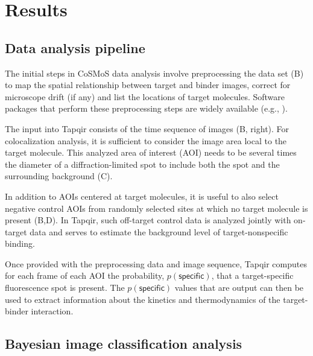 \section{Results}

\subsection{Data analysis pipeline}

The initial steps in CoSMoS data analysis involve preprocessing the data set (B) to map the spatial relationship between target and binder images, correct for microscope drift (if any) and list the locations of target molecules. Software packages that perform these preprocessing steps are widely available (e.g., \cite{Friedman2015-nx, Smith2019-yb}).

The input into Tapqir consists of the time sequence of images (B, right). For colocalization analysis, it is sufficient to consider the image area local to the target molecule. This analyzed area of interest (AOI) needs to be several times the diameter of a diffraction-limited spot to include both the spot and the surrounding background (C). 

In addition to AOIs centered at target molecules, it is useful to also select negative control AOIs from randomly selected sites at which no target molecule is present (B,D). In Tapqir, such off-target control data is analyzed jointly with on-target data and serves to estimate the background level of target-nonspecific binding. 

Once provided with the preprocessing data and image sequence, Tapqir computes for each frame of each AOI the  probability, $p(\mathsf{specific})$, that a target-specific fluorescence spot is present.   The $p(\mathsf{specific})$ values that are output can then be used to extract information about the kinetics and thermodynamics of the target-binder interaction.

\subsection{Bayesian image classification analysis}

